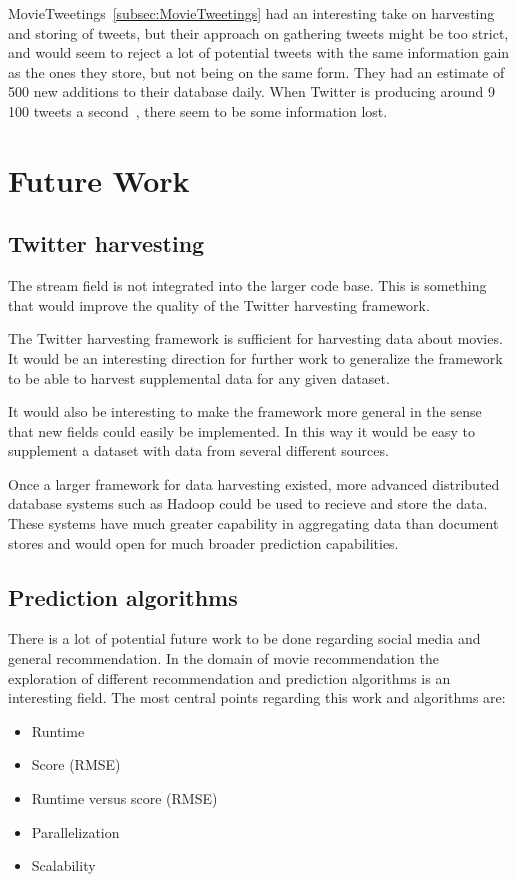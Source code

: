 MovieTweetings~\ref{subsec:MovieTweetings} had an interesting take on harvesting and storing of tweets, but their approach on gathering tweets might be too strict, and would seem to reject a lot of potential tweets with the same information gain as the ones they store, but not being on the same form. They had an estimate of 500 new additions to their database daily. When Twitter is producing around 9 100 tweets a second~\cite{twitt-stats}, there seem to be some information lost.



\section{Future Work}
\subsection{Twitter harvesting}
The stream field is not integrated into the larger code base. This is something that would improve the quality of the Twitter harvesting framework.

The Twitter harvesting framework is sufficient for harvesting data about movies. It would be an interesting direction for further work to generalize the framework to be able to harvest supplemental data for any given dataset.

It would also be interesting to make the framework more general in the sense that new fields could easily be implemented. In this way it would be easy to supplement a dataset with data from several different sources.

Once a larger framework for data harvesting existed, more advanced distributed database systems such as Hadoop could be used to recieve and store the data. These systems have much greater capability in aggregating data than document stores and would open for much broader prediction capabilities.


\subsection{Prediction algorithms}
There is a lot of potential future work to be done regarding social media and general recommendation. In the domain of movie recommendation the exploration of different recommendation and prediction algorithms is an interesting field. The most central points regarding this work and algorithms are:

\begin{itemize}
    \item Runtime
    \item Score (RMSE)
    \item Runtime versus score (RMSE)
    \item Parallelization
    \item Scalability
\end{itemize}


